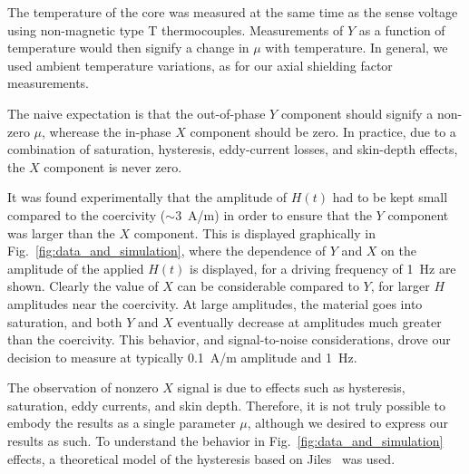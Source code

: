 The temperature of the core was measured at the same time as the sense
voltage using non-magnetic type T thermocouples.  Measurements of $Y$
as a function of temperature would then signify a change in $\mu$ with
temperature.  In general, we used ambient temperature variations, as
for our axial shielding factor measurements.


The naive expectation is that the out-of-phase $Y$ component should
signify a non-zero $\mu$, wherease the in-phase $X$ component should
be zero.  In practice, due to a combination of saturation, hysteresis,
eddy-current losses, and skin-depth effects, the $X$ component is
never zero.

It was found experimentally that the amplitude of $H(t)$ had to be
kept small compared to the coercivity ($\sim 3$~A/m) in order to
ensure that the $Y$ component was larger than the $X$ component.  This
is displayed graphically in Fig.~\ref{fig:data_and_simulation}, where
the dependence of $Y$ and $X$ on the amplitude of the applied $H(t)$
is displayed, for a driving frequency of 1~Hz are shown.  Clearly the
value of $X$ can be considerable compared to $Y$, for larger $H$
amplitudes near the coercivity.  At large amplitudes, the material
goes into saturation, and both $Y$ and $X$ eventually decrease at
amplitudes much greater than the coercivity.  This behavior, and
signal-to-noise considerations, drove our decision to measure at
typically 0.1~A/m amplitude and 1~Hz.

The observation of nonzero $X$ signal is due to effects such as
hysteresis, saturation, eddy currents, and skin depth.  Therefore, it
is not truly possible to embody the results as a single parameter
$\mu$, although we desired to express our results as such.  To
understand the behavior in Fig.~\ref{fig:data_and_simulation} effects,
a theoretical model of the hysteresis based on Jiles~\cite{bib:jiles}
was used.

